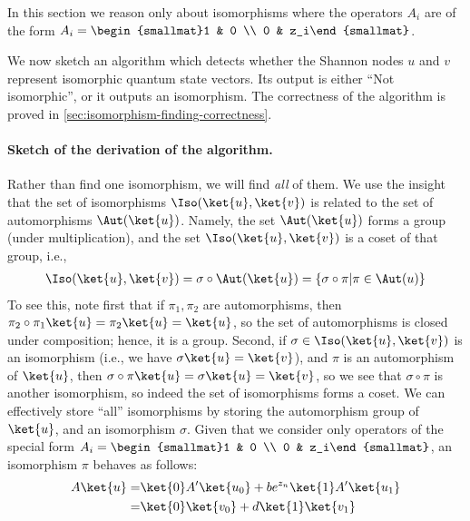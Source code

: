 In this section we reason only about isomorphisms where the operators $A_i$ are of the form $A_i=\begin{smallmat}1 & 0 \\ 0 & z_i\end{smallmat}$.

We now sketch an algorithm which detects whether the Shannon nodes $u$ and $v$ represent isomorphic quantum state vectors.
Its output is either ``Not isomorphic'', or it outputs an isomorphism.
The correctness of the algorithm is proved in \autoref{sec:isomorphism-finding-correctness}.

\paragraph{Sketch of the derivation of the algorithm.}
Rather than find one isomorphism, we will find \emph{all} of them.
We use the insight that the set of isomorphisms $\Iso(\ket{u},\ket{v})$ is related to the set of automorphisms $\Aut(\ket{u})$.
Namely, the set $\Aut(\ket{u})$ forms a group (under multiplication), and the set $\Iso(\ket{u},\ket{v})$ is a coset of that group, i.e.,
\begin{align}
\Iso(\ket{u},\ket{v})=\sigma\circ \Aut(\ket{u}) =\{\sigma\circ\pi|\pi\in\Aut(u)\}
\end{align}
To see this, note first that if $\pi_1,\pi_2$ are automorphisms, then $\pi_2\circ \pi_1\ket{u}=\pi_2\ket{u}=\ket{u}$, so the set of automorphisms is closed under composition; hence, it is a group.
Second, if $\sigma\in \Iso(\ket{u},\ket{v})$ is an isomorphism (i.e., we have $\sigma\ket{u}=\ket{v}$), and $\pi$ is an automorphism of $\ket{u}$, then $\sigma\circ \pi\ket{u}=\sigma\ket{u}=\ket{v}$, so we see that $\sigma\circ \pi$ is another isomorphism, so indeed the set of isomorphisms forms a coset.
We can effectively store ``all'' isomorphisms by storing the automorphism group of $\ket{u}$, and an isomorphism $\sigma$.
Given that we consider only operators of the special form $A_i=\begin{smallmat}1 & 0 \\ 0 & z_i\end{smallmat}$, an isomorphism $\pi$ behaves as follows:
\begin{align}
A\ket{u}=&\ket{0}A^\prime\ket{u_0}+be^{z_n}\ket{1}A^\prime\ket{u_1} \\
= & \ket{0}\ket{v_0}+d\ket{1}\ket{v_1}
\end{align}
